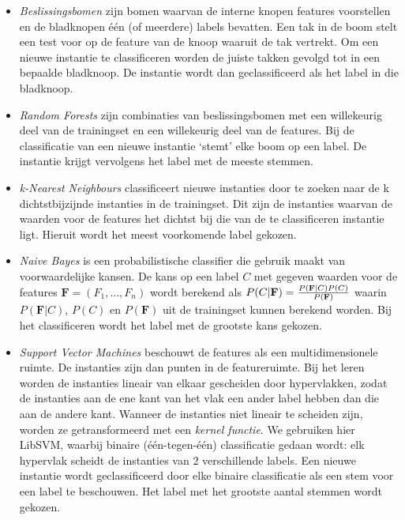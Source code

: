 \documentclass{article}
\begin{document}
\begin{itemize}
\item \textit{Beslissingsbomen} zijn bomen waarvan de interne knopen features voorstellen en de bladknopen \'e\'en (of meerdere) labels bevatten. Een tak in de boom stelt een test voor op de feature van de knoop waaruit de tak vertrekt. Om een nieuwe instantie te classificeren worden de juiste takken gevolgd tot in een bepaalde bladknoop. De instantie wordt dan geclassificeerd als het label in die bladknoop.
\item \textit{Random Forests} zijn combinaties van beslissingsbomen met een willekeurig deel van de trainingset en een willekeurig deel van de features. Bij de classificatie van een nieuwe instantie `stemt' elke boom op een label. De instantie krijgt vervolgens het label met de meeste stemmen.
\item \textit{k-Nearest Neighbours} classificeert nieuwe instanties door te zoeken naar de k dichtstbijzijnde instanties in de trainingset. Dit zijn de instanties waarvan de waarden voor de features het dichtst bij die van de te classificeren instantie ligt. Hieruit wordt het meest voorkomende label gekozen.
\item \textit{Naive Bayes} is een probabilistische classifier die gebruik maakt van voorwaardelijke kansen. De kans op een label $C$ met gegeven waarden voor de features $\mathbf{F}=(F_1, ..., F_n)$ wordt berekend als $P(C|\mathbf{F}) = { P(\mathbf{F}|C) P(C) \over P(\mathbf{F}) }$ waarin $P(\mathbf{F}|C)$, $P(C)$ en $P(\mathbf{F})$ uit de trainingset kunnen berekend worden. Bij het classificeren wordt het label met de grootste kans gekozen.
\item \textit{Support Vector Machines} beschouwt de features als een multidimensionele ruimte. De instanties zijn dan punten in de featureruimte. Bij het leren worden de instanties lineair van elkaar gescheiden door hypervlakken, zodat de instanties aan de ene kant van het vlak een ander label hebben dan die aan de andere kant. Wanneer de instanties niet lineair te scheiden zijn, worden ze getransformeerd met een \textit{kernel functie}. We gebruiken hier LibSVM, %
waarbij binaire (\'e\'en-tegen-\'e\'en) classificatie gedaan wordt: elk hypervlak scheidt de instanties van 2 verschillende labels. Een nieuwe instantie wordt geclassificeerd door elke binaire classificatie als een stem voor een label te beschouwen. Het label met het grootste aantal stemmen wordt gekozen.
\end{itemize}
\end{document}
